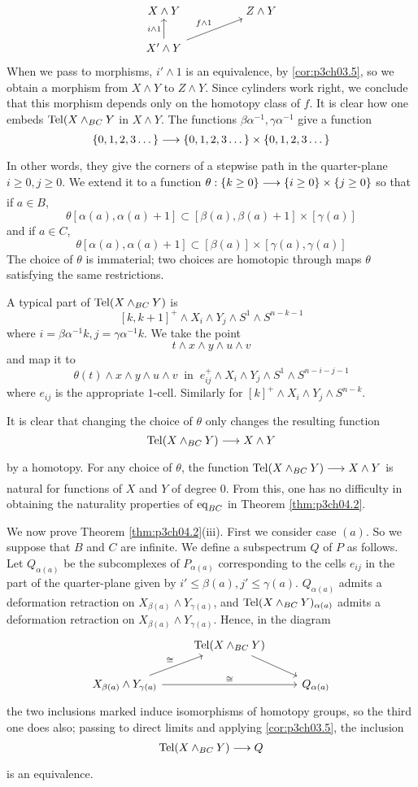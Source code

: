 \documentclass[../main]{subfiles}
\begin{document}
\[\begin{tikzcd}
X\wedge Y && Z\wedge Y\\ X'\wedge Y \arrow[u,"i\wedge 1"] \arrow[urr, "f\wedge 1"]
\end{tikzcd}\]
When we pass to morphisms, $i'\wedge 1$ is an equivalence, by \ref{cor:p3ch03.5}, so we obtain a morphism from $X\wedge Y$ to $Z\wedge Y$. Since cylinders work right, we
conclude that this morphism depends only on the homotopy class of $f$. It is clear how one embeds $\mathrm{Tel}(X\wedge_{BC} Y$ in $X\wedge Y$. The functions $\beta \alpha^{-1},\gamma \alpha^{-1}$ give a function \[\{0,1,2,3\dots\} \lar{}\{0,1,2,3\dots\}\times \{0,1,2,3\dots\} \]
In other words, they give the corners of a stepwise path in the quarter-plane $i\geq 0,j\geq 0$. We extend it to a function $\theta:\{k\geq 0\} \lar{} \{i\geq 0\}\times \{j\geq 0\}$ so that if $a\in B$,
\[\theta[\alpha(a),\alpha(a)+1]\subset [\beta(a),\beta(a)+1]\times [\gamma(a)] \]
and if $a\in C$,
\[ \theta[\alpha(a),\alpha(a)+1]\subset [\beta(a)]\times [\gamma(a),\gamma(a)] \]
The choice of $\theta$ is immaterial; two choices are homotopic through maps $\theta$ satisfying the same restrictions.

A typical part of $\mathrm{Tel}(X\wedge_{BC} Y)$ is 
\[[k,k+1]^+ \wedge X_i\wedge Y_j \wedge S^1 \wedge S^{n-k-1}\]
where $i=\beta \alpha^{-1} k, j=\gamma \alpha^{-1} k$. We take the point \[t\wedge x\wedge y\wedge u\wedge v\]
and map it to 
\[\theta(t)\wedge x\wedge y\wedge u\wedge v\ \text{ in } \  e_{ij}^+\wedge X_i \wedge Y_j \wedge S^1 \wedge S^{n-i-j-1}\]
where $e_{ij}$ is the appropriate $1$-cell. Similarly for $[k]^+ \wedge X_i \wedge Y_j \wedge S^{n-k}$.

It is clear that changing the choice of $\theta$ only changes the resulting function \[\te{Tel}(X\wedge_{BC} Y) \lar{} X\wedge Y \]
by a homotopy. For any choice of $\theta$, the function $\te{Tel}(X\wedge_{BC}Y)\lar{}X\wedge Y$ is natural for functions of $X$ and $Y$ of degree $0$. From this, one has no difficulty in obtaining the naturality properties of $\mathrm{eq}_{BC}$ in Theorem \ref{thm:p3ch04.2}.

We now prove Theorem \ref{thm:p3ch04.2}(iii). First we consider case $(a)$. So we suppose that $B$ and $C$ are infinite. We define a subspectrum $Q$ of $P$ as follows. Let $Q_{\alpha(a)}$ be the subcomplexes of $P_{\alpha(a)}$ corresponding to the cells $e_{ij}$ in the part of the quarter-plane given by $i'\leq \beta(a),j'\le \gamma(a)$. $Q_{\alpha(a)}$ admits a deformation retraction on $X_{\beta(a)}\wedge Y_{\gamma(a)}$, and $\mathrm{Tel}(X\wedge_{BC} Y)_{\alpha(a)}$ admits a deformation retraction on $X_{\beta(a)}\wedge Y_{\gamma(a)}$. Hence, in the diagram
\[\begin{tikzcd}
& \te{Tel}(X\wedge_{BC}Y)\arrow[dr]&\\ X_{\beta(a)}\wedge Y_{\gamma(a)} \arrow[ur,"\cong"] \arrow[rr,"\cong"] && Q_{\alpha(a)}
\end{tikzcd}\]
the two inclusions marked induce isomorphisms of homotopy groups, so
the third one does also; passing to direct limits and applying \ref{cor:p3ch03.5}, the inclusion \[\te{Tel}(X\wedge_{BC}Y)\lar{}Q\]
is an equivalence.
\end{document}
